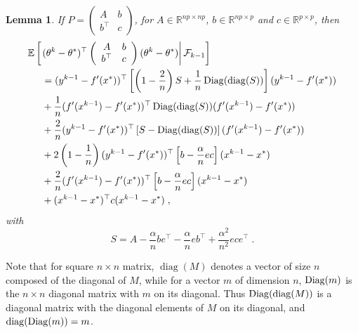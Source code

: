 \documentclass{article}
\newcommand{\diag}{\mathop{\rm diag}}
\newcommand{\Diag}{\mathop{\rm Diag}}
\newcommand{\rb}{\mathbb{R}}
\newtheorem{lemma}{Lemma}
\def\diag{\operatorname{diag}}
\def\E{_{\scriptscriptstyle E}}
\def \E{{\mathbb E}}
\def \E{{\mathbb E}}
\begin{document}
\begin{lemma}
If $ P = \left(
\begin{array}{cc} A & b \\ b^\top & c
\end{array}
\right)$,
for $A \in \rb^{np \times np}$, $b \in \rb^{np \times p}$ and $c \in \rb^{p \times p}$, then
\begin{align*}
&\E\left[\left.(\theta^k - \theta^*)^\top \left(\begin{array}{cc} A & b \\ b^\top & c
\end{array}\right) (\theta^k - \theta^*)\right| \mathcal{F}_{k-1}\right] \nonumber\\
&\hspace*{.5cm}=(y^{k-1} - f'(x^\ast))^\top \left[\left(1 - \frac{2}{n}\right)S + \frac{1}{n}\Diag(\diag(S))\right](y^{k-1} - f'(x^\ast))\\
&\hspace*{.5cm}+ \frac{1}{n}(f'(x^{k-1}) - f'(x^\ast))^\top \Diag(\diag(S))(f'(x^{k-1}) - f'(x^\ast))\\
&\hspace*{.5cm}+ \frac{2}{n}(y^{k-1} - f'(x^\ast))^\top \left[S - \Diag(\diag(S))\right] (f'(x^{k-1}) - f'(x^\ast))\\
&\hspace*{.5cm}+ 2\left(1 - \frac{1}{n}\right) (y^{k-1} - f'(x^\ast))^\top \left[b - \frac{\alpha}{n}ec\right](x^{k-1} - x^\ast)\\
&\hspace*{.5cm}+ \frac{2}{n}(f'(x^{k-1}) - f'(x^\ast))^\top\left[b - \frac{\alpha}{n}ec\right](x^{k-1} - x^\ast)\\
&\hspace*{.5cm}+ (x^{k-1} - x^\ast)^\top c (x^{k-1} - x^\ast) \; ,
\end{align*}
with
\[
S = A - \frac{\alpha}{n} b e^\top - \frac{\alpha}{n} e b^\top + \frac{\alpha^2}{n^2} e ce^\top \; .
\]
\end{lemma}
Note that for square $n \times n$ matrix, $\diag(M)$ denotes a vector of size $n$ composed of the diagonal of $M$, while for a vector $m$ of dimension $n$,
$\Diag(m)$ is the $n \times n$ diagonal matrix with $m$ on its diagonal. Thus $\Diag(\diag(M))$ is a diagonal matrix with the diagonal elements of $M$ on its diagonal, and $\diag(\Diag(m))=m$.
\end{document}
